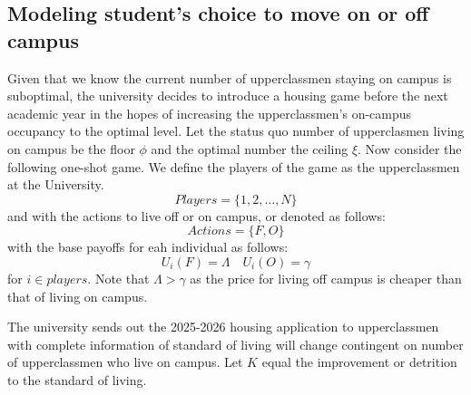 \documentclass[12pt]{article}
\begin{document}
\subsection{Modeling student's choice to move on or off campus}
Given that we know the current number of upperclassmen staying on campus is suboptimal, the university decides to introduce a housing game before the next academic year in the hopes of increasing the upperclassmen's on-campus occupancy to the optimal level. Let the status quo number of upperclasmen living on campus be the floor $\phi$ and the optimal number the ceiling $\xi$. Now consider the following one-shot game. We define the players of the game as the upperclassmen at the University.
\[
Players = \{1, 2, \dots, N \}
\]
and with the actions to live off or on campus, or denoted as follows:
\[
Actions = \{F, O\}
\]
with the base payoffs for eah individual as follows:
\[
U_i(F) = \Lambda \quad U_i(O) = \gamma
\]
for $i \in players$. Note that $\Lambda > \gamma$ as the price for living off campus is cheaper than that of living on campus. 

The university sends out the 2025-2026 housing application to upperclassmen with complete information of standard of living will change contingent on number of upperclassmen who live on campus. Let $K$ equal the improvement or detrition to the standard of living. 
\end{document}

